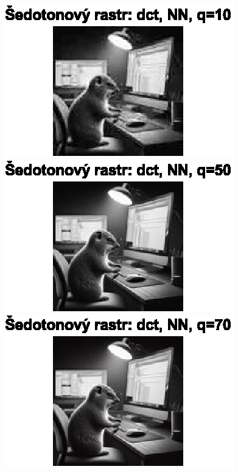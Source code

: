 \begin{figure}[H]
    \centering
    \begin{minipage}[b]{0.3\textwidth}
        \centering
        \includegraphics[width=\textwidth]{images/sedo_dct_NN_q10.eps}
    \end{minipage}
    \hfill
    \begin{minipage}[b]{0.3\textwidth}
        \centering
        \includegraphics[width=\textwidth]{images/sedo_dct_NN_q50.eps}
    \end{minipage}
    \hfill
    \begin{minipage}[b]{0.3\textwidth}
        \centering
        \includegraphics[width=\textwidth]{images/sedo_dct_NN_q70.eps}
    \end{minipage}
\end{figure}

